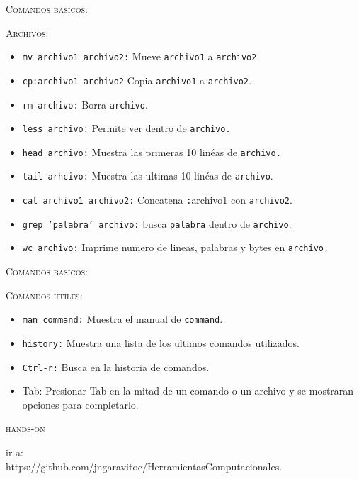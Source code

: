 \documentclass{beamer}
\begin{document}
\begin{frame}{\textsc{Comandos basicos:}}

\begin{center}
{\large \textsc{Archivos:}}
\end{center}

\begin{itemize}
\item \texttt{mv archivo1 archivo2:} \textrm{Mueve} \texttt{archivo1} \textrm{a} \texttt{archivo2}.
\item \texttt{cp:archivo1 archivo2} \textrm{Copia} \texttt{archivo1} \textrm{a} \texttt{archivo2}.
\item \texttt{rm archivo:} \textrm{Borra} \texttt{archivo}.
\item \texttt{less archivo:} \textrm{Permite ver dentro de} \texttt{archivo.}
\item \texttt{head archivo:} \textrm{Muestra las primeras 10 lin\'eas de} \texttt{archivo.}
\item \texttt{tail arhcivo:} \textrm{Muestra las ultimas 10 lin\'eas de} \texttt{archivo}.
\item \texttt{cat archivo1 archivo2:} \textrm{Concatena} \texttt:{archivo1} \textrm{con} \texttt{archivo2}.
\item \texttt{grep 'palabra' archivo:} \textrm{busca} \texttt{palabra} \textrm{dentro de} \texttt{archivo}.
\item \texttt{wc archivo:} \textrm{Imprime numero de lineas, palabras y bytes en} \texttt{archivo.}
\end{itemize}
\end{frame}



\begin{frame}{\textsc{Comandos basicos:}}

\begin{center}
{\large \textsc{Comandos utiles:}}
\end{center}

\begin{itemize}
\item \texttt{man command:} \textrm{Muestra el manual de} \texttt{command}.
\item \texttt{history:} \textrm{Muestra una lista de los ultimos comandos utilizados.}
\item \texttt{Ctrl-r:} \textrm{Busca en la historia de comandos.}
\item \textrm{Tab:} \textrm{Presionar Tab en la mitad de un comando o un archivo y se mostraran opciones para completarlo.}
\end{itemize}

\end{frame}


\begin{frame}{\textsc{hands-on}}

\begin{center}
{\Large \textrm{ir a: }}\\

https://github.com/jngaravitoc/HerramientasComputacionales.
\end{center}

\end{frame}

\end{document}
